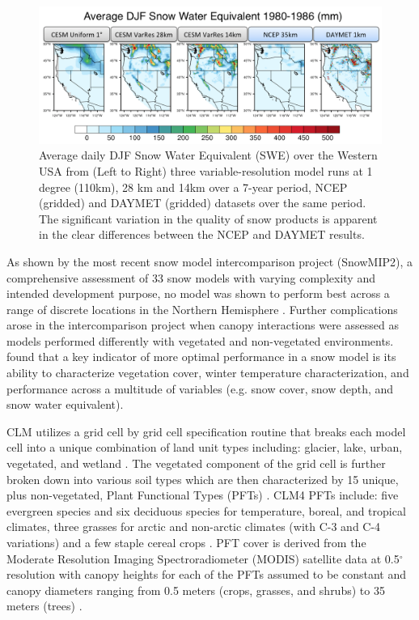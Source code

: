 \documentclass[11pt]{article}
\begin{document}
\begin{figure}
\begin{center}
\includegraphics[width=\textwidth]{VariableResolutionSWE2.png}
\end{center}
\caption{Average daily DJF Snow Water Equivalent (SWE) over the Western USA from (Left to Right) three variable-resolution model runs at 1 degree (110km), 28 km and 14km over a 7-year period, NCEP (gridded) and DAYMET (gridded) datasets over the same period.  The significant variation in the quality of snow products is apparent in the clear differences between the NCEP and DAYMET results.} \label{fig:VarResSWE}
\end{figure}

As shown by the most recent snow model intercomparison project (SnowMIP2), a comprehensive assessment of 33 snow models with varying complexity and intended development purpose, no model was shown to perform best across a range of discrete locations in the Northern Hemisphere \citep{rutter2009SnowMIP2}.  Further complications arose in the intercomparison project when canopy interactions were assessed as models performed differently with vegetated and non-vegetated environments.  \citet{rutter2009SnowMIP2} found that a key indicator of more optimal performance in a snow model is its ability to characterize vegetation cover, winter temperature characterization, and performance across a multitude of variables (e.g. snow cover, snow depth, and snow water equivalent).
    
CLM utilizes a grid cell by grid cell specification routine that breaks each model cell into a unique combination of land unit types including: glacier, lake, urban, vegetated, and wetland \citep{lawrence2011parameterization}.  The vegetated component of the grid cell is further broken down into various soil types which are then characterized by 15 unique, plus non-vegetated, Plant Functional Types (PFTs) \citep{lawrence2011parameterization}. CLM4 PFTs include: five evergreen species and six deciduous species for temperature, boreal, and tropical climates, three grasses for arctic and non-arctic climates (with C-3 and C-4 variations) and a few staple cereal crops \citep{lawrence2011parameterization}.  PFT cover is derived from the Moderate Resolution Imaging Spectroradiometer (MODIS) satellite data at 0.5$^\circ$ resolution with canopy heights for each of the PFTs assumed to be constant and canopy diameters ranging from 0.5 meters (crops, grasses, and shrubs) to 35 meters (trees) \citep{lawrence2011parameterization}.  
\end{document}
